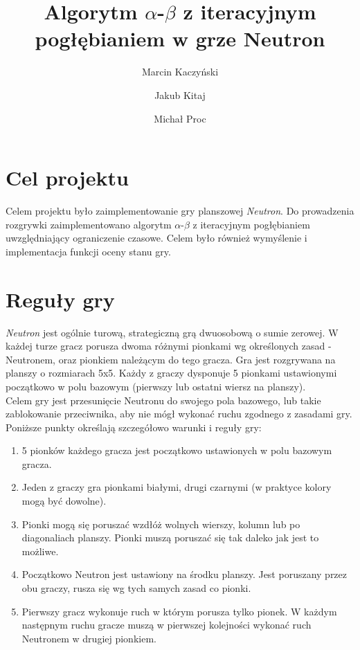 \documentclass[a4paper,12pt]{article}
\title{Algorytm $\alpha$-$\beta$ z iteracyjnym pogłębianiem w grze Neutron}
\author{Marcin Kaczyński \and Jakub Kitaj \and Michał Proc}
\begin{document}
\maketitle

\section{Cel projektu}

Celem projektu było zaimplementowanie gry planszowej \textit{Neutron}. Do prowadzenia rozgrywki
zaimplementowano algorytm $\alpha$-$\beta$ z iteracyjnym pogłębianiem uwzględniający ograniczenie czasowe. 
Celem było również wymyślenie i implementacja funkcji oceny stanu gry.

\section{Reguły gry}

\textit{Neutron} jest ogólnie turową, strategiczną grą dwuosobową o sumie zerowej. W każdej turze
gracz porusza dwoma różnymi pionkami wg określonych zasad - Neutronem, oraz pionkiem należącym
do tego gracza. Gra jest rozgrywana na planszy o rozmiarach 5x5. Każdy z graczy dysponuje 5
pionkami ustawionymi początkowo w polu bazowym (pierwszy lub ostatni wiersz na planszy).\\

Celem gry jest przesunięcie Neutronu do swojego pola bazowego, lub takie zablokowanie przeciwnika,
aby nie mógł wykonać ruchu zgodnego z zasadami gry.\\

Poniższe punkty określają szczegółowo warunki i reguły gry:\\

\begin{enumerate}
\item
	5 pionków każdego gracza jest początkowo ustawionych w polu bazowym gracza.
\item
	Jeden z graczy gra pionkami białymi, drugi czarnymi (w praktyce kolory mogą być dowolne).
\item
	Pionki mogą się poruszać wzdłóż wolnych wierszy, kolumn lub po diagonaliach planszy. Pionki
	muszą poruszać się tak daleko jak jest to możliwe.
\item
	Początkowo Neutron jest ustawiony na środku planszy. Jest poruszany przez obu graczy, rusza się
	wg tych samych zasad co pionki.
\item
	Pierwszy gracz wykonuje ruch w którym porusza tylko pionek. W każdym następnym ruchu gracze muszą
	w pierwszej kolejności wykonać ruch Neutronem w drugiej pionkiem.
\end{enumerate}
\end{document}
